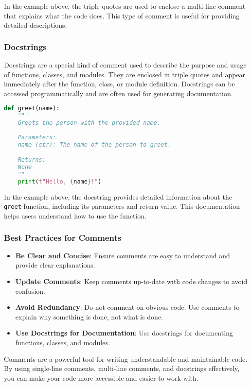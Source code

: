 In the example above, the triple quotes are used to enclose a multi-line comment that explains what the code does. This type of comment is useful for providing detailed descriptions.

\subsubsection{Docstrings}

Docstrings are a special kind of comment used to describe the purpose and usage of functions, classes, and modules. They are enclosed in triple quotes and appear immediately after the function, class, or module definition. Docstrings can be accessed programmatically and are often used for generating documentation.

\begin{lstlisting}[language=Python, caption=Docstring Example]
def greet(name):
    """
    Greets the person with the provided name.
    
    Parameters:
    name (str): The name of the person to greet.

    Returns:
    None
    """
    print(f"Hello, {name}!")
\end{lstlisting}

In the example above, the docstring provides detailed information about the \texttt{greet} function, including its parameters and return value. This documentation helps users understand how to use the function.

\subsubsection{Best Practices for Comments}
\begin{itemize}
    \item \textbf{Be Clear and Concise}: Ensure comments are easy to understand and provide clear explanations.
    \item \textbf{Update Comments}: Keep comments up-to-date with code changes to avoid confusion.
    \item \textbf{Avoid Redundancy}: Do not comment on obvious code. Use comments to explain why something is done, not what is done.
    \item \textbf{Use Docstrings for Documentation}: Use docstrings for documenting functions, classes, and modules.
\end{itemize}
Comments are a powerful tool for writing understandable and maintainable code. By using single-line comments, multi-line comments, and docstrings effectively, you can make your code more accessible and easier to work with.

